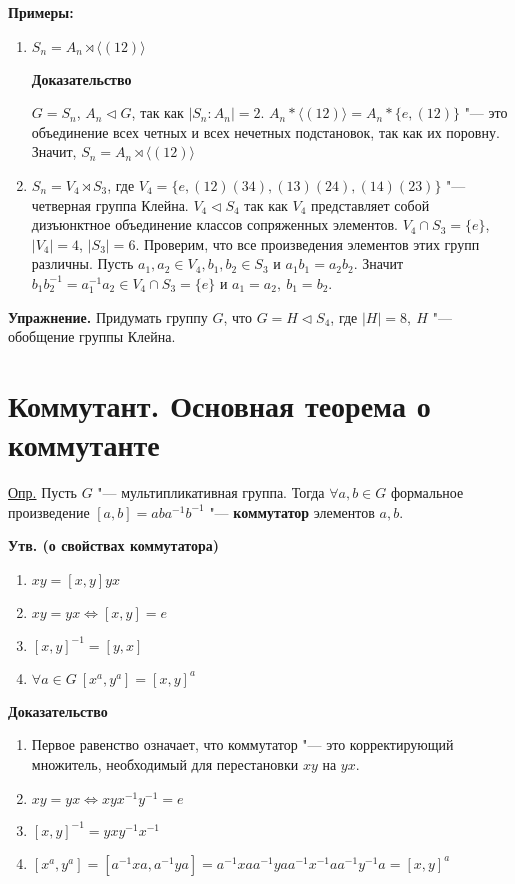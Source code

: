 \documentclass{article}
\begin{document}
\textbf{Примеры:}
\begin{enumerate}
	\item $S_n = A_n \rtimes \langle (1 2) \rangle$
	
	\textbf{Доказательство}
	
	$G = S_n$, $A_n \triangleleft G$, так как $|S_n:A_n| = 2$. $A_n*\langle (1 2) \rangle = A_n*\{e, (1 2)\}$ "--- это объединение всех четных и всех нечетных подстановок, так как их поровну. Значит, $S_n = A_n \rtimes \langle (1 2) \rangle$
	
	\item $S_n = V_4 \rtimes S_3$, где $V_4 = \{e, (1 2)(3 4), (1 3)(2 4), (1 4)(2 3)\}$ "--- четверная группа Клейна. $V_4 \triangleleft S_4$ так как $V_4$ представляет собой дизъюнктное объединение классов сопряженных элементов.
	$V_4 \cap S_3 = \{e\}$, $|V_4| = 4$, $|S_3| = 6$. Проверим, что все произведения элементов этих групп различны. Пусть $a_1, a_2 \in V_4, b_1, b_2 \in S_3$ и $a_1b_1 = a_2b_2$. Значит $b_1b_2^{-1} = a_1^{-1}a_2 \in V_4 \cap S_3 = \{e\}$ и $a_1 = a_2, \  b_1 = b_2$.
\end{enumerate}

\vspace{10pt}

\textbf{Упражнение.} Придумать группу $G$, что $G = H \triangleleft S_4$, где $|H| = 8, \  H$ "--- обобщение группы Клейна.

\section{Коммутант. Основная теорема о коммутанте}

\underline{Опр.} Пусть $G$ "--- мультипликативная группа. Тогда $\forall a, b \in G$ формальное произведение $[a, b] = aba^{-1}b^{-1}$ "--- \textbf{коммутатор} элементов $a, b$.

\vspace{5pt}

\textbf{Утв. (о свойствах коммутатора)}
\begin{enumerate}
	\item $xy = [x, y]yx$
	\item $xy = yx \Leftrightarrow [x, y] = e$
	\item $[x, y]^{-1} = [y, x]$
	\item $\forall a \in G \  [x^a, y^a] = [x, y]^a$
\end{enumerate}

\textbf{Доказательство}
\begin{enumerate}
	\item Первое равенство означает, что коммутатор "--- это корректирующий множитель, необходимый для перестановки $xy$ на $yx$.
	\item $xy = yx \Leftrightarrow xyx^{-1}y^{-1} = e$
	\item $[x, y]^{-1} = yxy^{-1}x^{-1}$
	\item $[x^a, y^a] = [a^{-1}xa, a^{-1}ya] = a^{-1}xaa^{-1}yaa^{-1}x^{-1}aa^{-1}y^{-1}a = [x, y]^a$
\end{enumerate}
\end{document}
